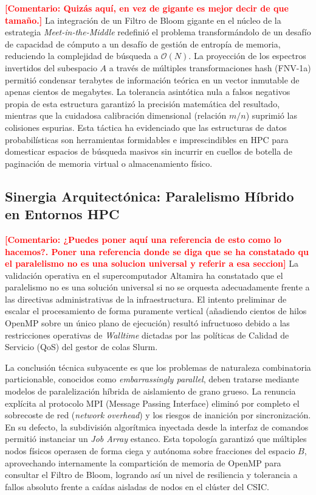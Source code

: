 \documentclass[12pt,a4paper]{tfg_domingo}
\newcommand{\Comentario}[1]{\textcolor{red}{\textbf{[Comentario:
      #1]}}}
\begin{document}
\Comentario{Quizás aquí, en vez de gigante es mejor decir de que tamaño.}
La integración de un Filtro de Bloom gigante en el núcleo de la estrategia \emph{Meet-in-the-Middle} redefinió el problema transformándolo de un desafío de capacidad de cómputo a un desafío de gestión de entropía de memoria, reduciendo la complejidad de búsqueda a $\mathcal{O}(N)$. La proyección de los espectros invertidos del subespacio $A$ a través de múltiples transformaciones hash (FNV-1a) permitió condensar terabytes de información teórica en un vector inmutable de apenas cientos de megabytes. La tolerancia asintótica nula a falsos negativos propia de esta estructura garantizó la precisión matemática del resultado, mientras que la cuidadosa calibración dimensional (relación $m/n$) suprimió las colisiones espurias. Esta táctica ha evidenciado que las estructuras de datos probabilísticas son herramientas formidables e imprescindibles en HPC para domesticar espacios de búsqueda masivos sin incurrir en cuellos de botella de paginación de memoria virtual o almacenamiento físico.

\subsection{Sinergia Arquitectónica: Paralelismo Híbrido en Entornos HPC}
\Comentario{¿Puedes poner aquí una referencia de esto como lo hacemos?. Poner una referencia donde se diga que se ha constatado qu el paralelismo no es una solucion universal y referir a esa seccion}
La validación operativa en el supercomputador Altamira ha constatado que el paralelismo no es una solución universal si no se orquesta adecuadamente frente a las directivas administrativas de la infraestructura. El intento preliminar de escalar el procesamiento de forma puramente vertical (añadiendo cientos de hilos OpenMP sobre un único plano de ejecución) resultó infructuoso debido a las restricciones operativas de \emph{Walltime} dictadas por las políticas de Calidad de Servicio (QoS) del gestor de colas Slurm.

La conclusión técnica subyacente es que los problemas de naturaleza combinatoria particionable, conocidos como \emph{embarrassingly parallel}, deben tratarse mediante modelos de paralelización híbrida de aislamiento de grano grueso. La renuncia explícita al protocolo MPI (Message Passing Interface) eliminó por completo el sobrecoste de red (\emph{network overhead}) y los riesgos de inanición por sincronización. En su defecto, la subdivisión algorítmica inyectada desde la interfaz de comandos permitió instanciar un \emph{Job Array} estanco. Esta topología garantizó que múltiples nodos físicos operasen de forma ciega y autónoma sobre fracciones del espacio $B$, aprovechando internamente la compartición de memoria de OpenMP para consultar el Filtro de Bloom, logrando así un nivel de resiliencia y tolerancia a fallos absoluto frente a caídas aisladas de nodos en el clúster del CSIC.
\end{document}
